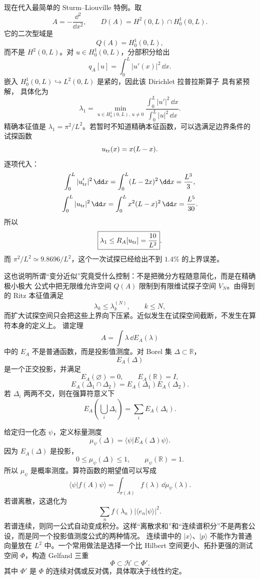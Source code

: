 现在代入最简单的 Sturm--Liouville 特例。取
\[
A=-\frac{\dd^2}{\dd x^2},
\qquad
D(A)=H^2(0,L)\cap H_0^1(0,L).
\]
它的二次型域是
\[
Q(A)=H_0^1(0,L),
\]
而不是 $H^2(0,L)$。对 $u\in H_0^1(0,L)$，分部积分给出
\[
q_A[u]=\int_0^L|u'(x)|^2\,\dd x.
\]
嵌入 $H_0^1(0,L)\hookrightarrow L^2(0,L)$ 是紧的，因此该 Dirichlet 拉普拉斯算子 具有紧预解， 具体化为
\begin{equation*}\boxed{
\lambda_1=
\min_{u\in H_0^1(0,L),\,u\ne0}
\frac{\int_0^L|u'|^2\,\dd x}{\int_0^L|u|^2\,\dd x}
}.\end{equation*}
精确本征值是 $\lambda_1=\pi^2/L^2$。若暂时不知道精确本征函数，可以选满足边界条件的试探函数
\[
u_{\rm tr}(x)=x(L-x).
\]
逐项代入：
\[
\int_0^L|u_{\rm tr}'|^2\,\dd x
=\int_0^L(L-2x)^2\,\dd x
=\frac{L^3}{3},
\]
\[
\int_0^L|u_{\rm tr}|^2\,\dd x
=\int_0^Lx^2(L-x)^2\,\dd x
=\frac{L^5}{30}.
\]
所以
\begin{equation*}\boxed{
\lambda_1\le R_A[u_{\rm tr}]=\frac{10}{L^2}
}.\end{equation*}
而 $\pi^2/L^2\simeq9.8696/L^2$，这个一次试探已经给出不到 $1.4\%$ 的上界误差。

这也说明所谓“变分近似”究竟受什么控制：不是把微分方程随意简化，而是在精确 极小极大 公式中把无限维允许空间 $Q(A)$ 限制到有限维试探子空间 $V_N$。由得到的 Ritz 本征值满足
\[
\lambda_k\le\lambda_k^{(N)},
\qquad k\le N,
\]
而扩大试探空间只会把这些上界向下压紧。近似发生在试探空间截断，不发生在算符本身的定义上。
谱定理
\[
A=\int\lambda\,\dd E_A(\lambda)
\]
中的 $E_A$ 不是普通函数，而是投影值测度。对 Borel 集 $\Delta\subset\mathbb R$，
\[
E_A(\Delta)
\]
是一个正交投影，并满足
\[
E_A(\varnothing)=0,
\qquad
E_A(\mathbb R)=I,
\]
\[
E_A(\Delta_1\cap\Delta_2)
=E_A(\Delta_1)E_A(\Delta_2).
\]
若 $\Delta_i$ 两两不交，则在强算符意义下
\[
E_A\left(\bigcup_i\Delta_i\right)
=\sum_iE_A(\Delta_i).
\]

给定归一化态 $\psi$，定义标量测度
\[
\mu_\psi(\Delta)
=\langle\psi|E_A(\Delta)\psi\rangle.
\]
因为 $E_A(\Delta)$ 是投影，
\[
0\le\mu_\psi(\Delta)\le1,
\qquad
\mu_\psi(\mathbb R)=1.
\]
所以 $\mu_\psi$ 是概率测度。算符函数的期望值可以写成
\begin{equation*}\boxed{
\langle\psi|f(A)\psi\rangle
=\int_{\sigma(A)}f(\lambda)\,\dd\mu_\psi(\lambda)
}.\end{equation*}
若谱离散，这退化为
\[
\sum_n f(\lambda_n)|\langle e_n|\psi\rangle|^2.
\]
若谱连续，则同一公式自动变成积分。这样“离散求和”和“连续谱积分”不是两套公设，而是同一个投影值测度公式的两种情况。
连续谱中的 $|x\rangle$、$|p\rangle$ 不能作为普通向量放在 $L^2$ 中。一个常用做法是选择一个比 Hilbert 空间更小、拓扑更强的测试空间 $\Phi$，构造 Gelfand 三重
\begin{equation*}\boxed{
\Phi\subset\mathcal H\subset\Phi'
}.\end{equation*}
其中 $\Phi'$ 是 $\Phi$ 的连续对偶或反对偶，具体取决于线性约定。


